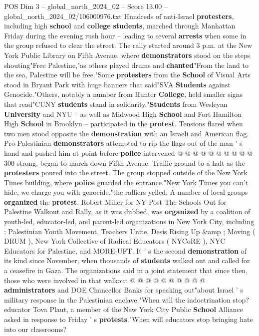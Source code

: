 \begin{textsample}{POS Dim 3 – global\_north\_2024\_02 – Score 13.00 – global\_north\_2024\_02/106000976.txt}  \label{ex:f3_pos_250}
Hundreds of anti-Israel \textbf{protesters}, including high \textbf{school} and \textbf{college} \textbf{students}, marched through Manhattan Friday during the evening rush hour -- leading to several \textbf{arrests} when some in the group refused to clear the street.
The rally started around 3 p.m. at the New York Public Library on Fifth Avenue, where \textbf{demonstrators} stood on the steps shouting"Free Palestine,"as others played drums and \textbf{chanted}"From the land to the sea, Palestine will be free."Some \textbf{protesters} from the \textbf{School} of Visual Arts stood in Bryant Park with huge banners that said"SVA \textbf{Students} against Genocide."Others, notably a number from Hunter \textbf{College}, held smaller signs that read"CUNY \textbf{students} stand in solidarity."\textbf{Students} from Wesleyan \textbf{University} and NYU -- as well as Midwood High \textbf{School} and Fort Hamilton High \textbf{School} in Brooklyn -- participated in the \textbf{protest}.
Tensions flared when two men stood opposite the \textbf{demonstration} with an Israeli and American flag.
Pro-Palestinian \textbf{demonstrators} attempted to rip the flags out of the man ' s hand and pushed him at point before \textbf{police} intervened @ @ @ @ @ @ @ @ @ @ 300-strong, began to march down Fifth Avenue.
Traffic ground to a halt as the \textbf{protesters} poured into the street.
The group stopped outside of the New York Times building, where \textbf{police} guarded the entrance."New York Times you can't hide, we charge you with genocide,"the ralliers yelled.
A number of local groups \textbf{organized} the \textbf{protest}.
Robert Miller for NY Post The Schools Out for Palestine Walkout and Rally, as it was dubbed, was \textbf{organized} by a coalition of youth-led, educator-led, and parent-led organizations in New York City, including : Palestinian Youth Movement, Teachers Unite, Desis Rising Up \&amp ; Moving ( DRUM ), New York Collective of Radical Educators ( NYCoRE ), NYC Educators for Palestine, and MORE-UFT.
It ' s the second \textbf{demonstration} of its kind since November, when thousands of \textbf{students} walked out and called for a ceasefire in Gaza.
The organizations said in a joint statement that since then, those who were involved in that walkout @ @ @ @ @ @ @ @ @ @ \textbf{administrators} and DOE Chancellor Banks for speaking out"about Israel ' s military response in the Palestinian enclave."When will the indoctrination stop? educator Tova Plaut, a member of the New York City Public \textbf{School} Alliance asked in response to Friday ' s \textbf{protests}."When will educators stop bringing hate into our classrooms?

\end{textsample}
